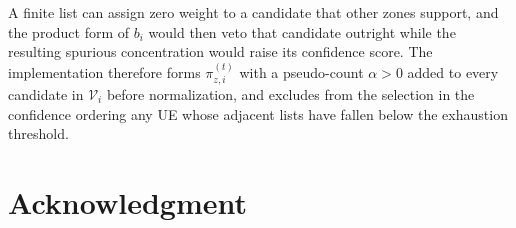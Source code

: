 \documentclass[journal]{IEEEtran}
\newcommand{\calV}{\mathcal{V}}  %
\begin{document}
A finite list can assign zero weight to a candidate that other zones support, and the product form of $b_i$ would then veto that candidate outright while the resulting spurious concentration would raise its confidence score. The implementation therefore forms $\pi_{z,i}^{(t)}$ with a pseudo-count $\alpha>0$ added to every candidate in $\calV_i$ before normalization, and excludes from the selection in the confidence ordering any UE whose adjacent lists have fallen below the exhaustion threshold.

\section*{Acknowledgment}
\end{document}
